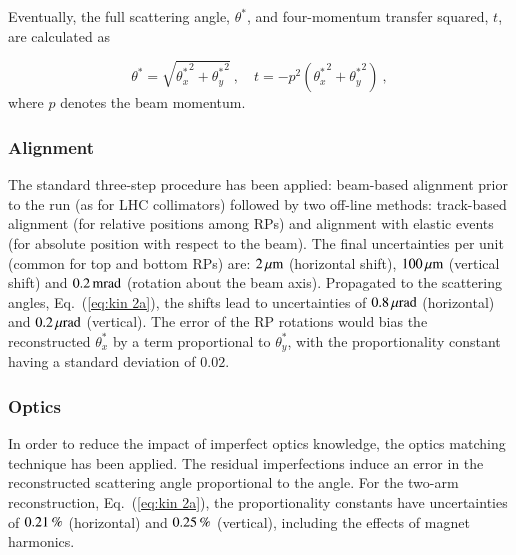 Eventually, the full scattering angle, $\theta^*$, and four-momentum transfer squared, $t$, are calculated as

\begin{equation}
\label{eq:th t}
\theta^* = \sqrt{{\theta_x^*}^2 + {\theta_y^*}^2}\ ,\quad t = - p^2 ({\theta_x^*}^2 + {\theta_y^*}^2)\ ,
\end{equation}
where $p$ denotes the beam momentum.


\subsubsection{Alignment}
\label{sec:alignment}

The standard three-step procedure \cite{totem-ijmp} has been applied: beam-based alignment prior to the run (as for LHC collimators) followed by two off-line methods: track-based alignment (for relative positions among RPs) and alignment with elastic events (for absolute position with respect to the beam). The final uncertainties per unit (common for top and bottom RPs) are: $2\,{\rm \mu m}$ (horizontal shift), $100\,{\rm \mu m}$ (vertical shift) and $0.2\,{\rm mrad}$ (rotation about the beam axis). Propagated to the scattering angles, Eq.~(\ref{eq:kin 2a}), the shifts lead to uncertainties of $0.8\,{\rm \mu rad}$ (horizontal) and $0.2\,{\rm \mu rad}$ (vertical). The error of the RP rotations would bias the reconstructed $\theta_x^*$ by a term proportional to $\theta_y^*$, with the proportionality constant having a standard deviation of $0.02$.



\subsubsection{Optics}
\label{sec:optics}

In order to reduce the impact of imperfect optics knowledge, the optics matching technique \cite{totem-optics} has been applied. The residual imperfections induce an error in the reconstructed scattering angle proportional to the angle. For the two-arm reconstruction, Eq.~(\ref{eq:kin 2a}), the proportionality constants have uncertainties of $0.21\,{\rm \%}$ (horizontal) and $0.25\,{\rm \%}$ (vertical), including the effects of magnet harmonics.


